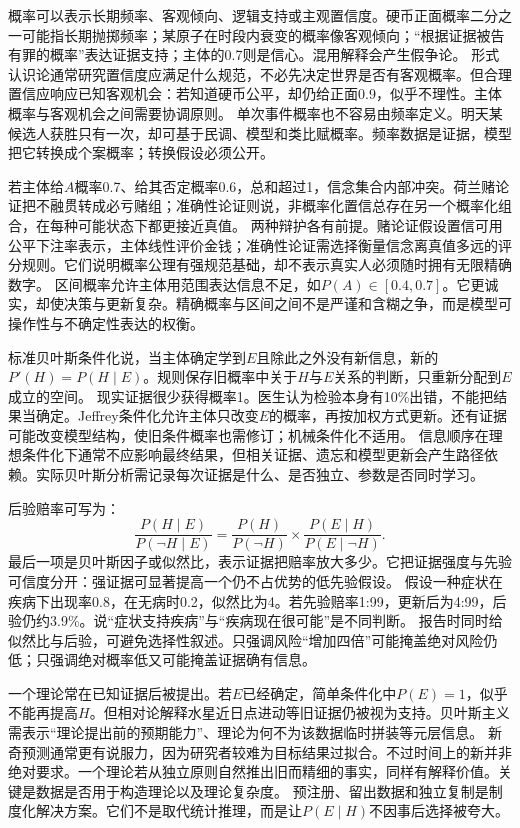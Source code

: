 概率可以表示长期频率、客观倾向、逻辑支持或主观置信度。硬币正面概率二分之一可能指长期抛掷频率；某原子在时段内衰变的概率像客观倾向；“根据证据被告有罪的概率”表达证据支持；主体的0.7则是信心。混用解释会产生假争论。 形式认识论通常研究置信度应满足什么规范，不必先决定世界是否有客观概率。但合理置信应响应已知客观机会：若知道硬币公平，却仍给正面0.9，似乎不理性。主体概率与客观机会之间需要协调原则。 单次事件概率也不容易由频率定义。明天某候选人获胜只有一次，却可基于民调、模型和类比赋概率。频率数据是证据，模型把它转换成个案概率；转换假设必须公开。

若主体给$A$概率0.7、给其否定概率0.6，总和超过1，信念集合内部冲突。荷兰赌论证把不融贯转成必亏赌组；准确性论证则说，非概率化置信总存在另一个概率化组合，在每种可能状态下都更接近真值\parencite{joyce1998}。 两种辩护各有前提。赌论证假设置信可用公平下注率表示，主体线性评价金钱；准确性论证需选择衡量信念离真值多远的评分规则。它们说明概率公理有强规范基础，却不表示真实人必须随时拥有无限精确数字。 区间概率允许主体用范围表达信息不足，如$P(A)\in[0.4,0.7]$。它更诚实，却使决策与更新复杂。精确概率与区间之间不是严谨和含糊之争，而是模型可操作性与不确定性表达的权衡。

标准贝叶斯条件化说，当主体确定学到$E$且除此之外没有新信息，新的$P'(H)=P(H\mid E)$。规则保存旧概率中关于$H$与$E$关系的判断，只重新分配到$E$成立的空间。 现实证据很少获得概率1。医生认为检验本身有10\%出错，不能把结果当确定。Jeffrey条件化允许主体只改变$E$的概率，再按加权方式更新。还有证据可能改变模型结构，使旧条件概率也需修订；机械条件化不适用。 信息顺序在理想条件化下通常不应影响最终结果，但相关证据、遗忘和模型更新会产生路径依赖。实际贝叶斯分析需记录每次证据是什么、是否独立、参数是否同时学习。

后验赔率可写为：
\[
\frac{P(H\mid E)}{P(\neg H\mid E)}=
\frac{P(H)}{P(\neg H)}\times
\frac{P(E\mid H)}{P(E\mid\neg H)}.
\]
最后一项是贝叶斯因子或似然比，表示证据把赔率放大多少。它把证据强度与先验可信度分开：强证据可显著提高一个仍不占优势的低先验假设。 假设一种症状在疾病下出现率0.8，在无病时0.2，似然比为4。若先验赔率1:99，更新后为4:99，后验仍约3.9\%。说“症状支持疾病”与“疾病现在很可能”是不同判断。 报告时同时给似然比与后验，可避免选择性叙述。只强调风险“增加四倍”可能掩盖绝对风险仍低；只强调绝对概率低又可能掩盖证据确有信息。

一个理论常在已知证据后被提出。若$E$已经确定，简单条件化中$P(E)=1$，似乎不能再提高$H$。但相对论解释水星近日点进动等旧证据仍被视为支持。贝叶斯主义需表示“理论提出前的预期能力”、理论为何不为该数据临时拼装等元层信息。 新奇预测通常更有说服力，因为研究者较难为目标结果过拟合。不过时间上的新并非绝对要求。一个理论若从独立原则自然推出旧而精细的事实，同样有解释价值。关键是数据是否用于构造理论以及理论复杂度。 预注册、留出数据和独立复制是制度化解决方案。它们不是取代统计推理，而是让$P(E\mid H)$不因事后选择被夸大。


